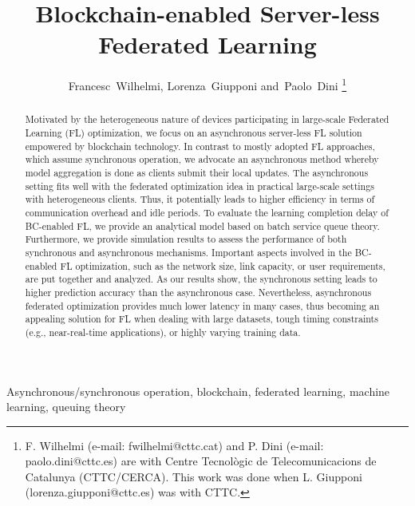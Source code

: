 \documentclass[lettersize,journal]{IEEEtran}
\begin{document}
\title{Blockchain-enabled Server-less\\ Federated Learning}

\author{Francesc~Wilhelmi, Lorenza~Giupponi and~Paolo~Dini %
\thanks{F. Wilhelmi (e-mail: fwilhelmi@cttc.cat) and P. Dini (e-mail: paolo.dini@cttc.es) are with Centre Tecnol\`ogic de Telecomunicacions de Catalunya (CTTC/CERCA). This work was done when L. Giupponi (lorenza.giupponi@cttc.es) was with CTTC.}%
}

\maketitle

\begin{abstract}
Motivated by the heterogeneous nature of devices participating in large-scale Federated Learning (FL) optimization, we focus on an asynchronous server-less FL solution empowered by blockchain technology. In contrast to mostly adopted FL approaches, which assume synchronous operation, we advocate an asynchronous method whereby model aggregation is done as clients submit their local updates. The asynchronous setting fits well with the federated optimization idea in practical large-scale settings with heterogeneous clients. Thus, it potentially leads to higher efficiency in terms of communication overhead and idle periods. To evaluate the learning completion delay of BC-enabled FL, we provide an analytical model based on batch service queue theory. Furthermore, we provide simulation results to assess the performance of both synchronous and asynchronous mechanisms. Important aspects involved in the BC-enabled FL optimization, such as the network size, link capacity, or user requirements, are put together and analyzed. As our results show, the synchronous setting leads to higher prediction accuracy than the asynchronous case. Nevertheless, asynchronous federated optimization provides much lower latency in many cases, thus becoming an appealing solution for FL when dealing with large datasets, tough timing constraints (e.g., near-real-time applications), or highly varying training data.
\end{abstract}

\begin{IEEEkeywords}
Asynchronous/synchronous operation, blockchain, federated learning, machine learning, queuing theory
\end{IEEEkeywords}

\maketitle
\end{document}
